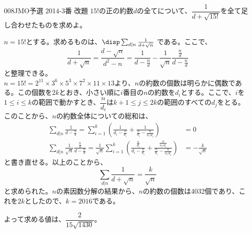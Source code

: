 \begin{thm}{008}{}{JMO予選 2014-3番 改題}
 $15!$の正の約数$d$の全てについて、$\dfrac{1}{d+\sqrt{15!}}$を全て足し合わせたものを求めよ。
\end{thm}

$n=15!$とする。求めるものは、$\disp \sum_{d|n}\frac{1}{d+\sqrt{n}}$ である。ここで、
\[ \frac{1}{d+\sqrt{n}} = \frac{d-\sqrt{n}}{d^2-n} = \frac{1}{d-\frac{n}{d}}-\frac{1}{\sqrt{n}}\frac{\frac{n}{d}}{d-\frac{n}{d}} \]
と整理できる。\\
$n=15!=2^{11}\times 3^6\times 5^3\times 7^2\times 11\times 13$より、$n$の約数の個数は明らかに偶数である。この個数を$2k$とおき、小さい順に$i$番目の$n$の約数を$d_i$とする。ここで、$i$を$1\le i \le k$の範囲で動かすとき、$\dfrac{n}{d_i}$は$k+1\le j \le 2k$の範囲のすべての$d_j$をとる。このことから、$n$の約数全体についての総和は、
\begin{align*}
 \sum_{d|n} \frac{1}{d-\frac{n}{d}}=\sum_{i=1}^k \left(\frac{1}{d_i-\frac{n}{d_i}}+\frac{1}{\frac{n}{d_i}-\frac{n}{n/d_i}}\right) &= 0 \\
 \sum_{d|n} \frac{1}{\sqrt{n}}\frac{\frac{n}{d}}{d-\frac{n}{d}} = \frac{1}{\sqrt{n}} \sum_{i=1}^k \left(\frac{\frac{n}{d_i}}{d_i-\frac{n}{d_i}} + \frac{\frac{n}{n/d_i}}{\frac{n}{d_i}-\frac{n}{n/d_i}}\right) &= -\frac{k}{\sqrt{n}} 
\end{align*}
と書き直せる。以上のことから、
\[ \sum_{d|n}\frac{1}{d+\sqrt{n}} = \frac{k}{\sqrt{n}} \]
と求められた。$n$の素因数分解の結果から、$n$の約数の個数は4032個であり、これを$2k$としたので、$k=2016$である。

よって求める値は、\textbf{$\dfrac{2}{15\sqrt{1430}}$}。